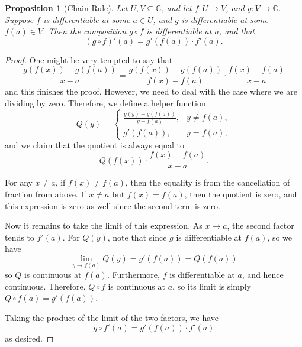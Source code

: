\documentclass[11pt]{article}
\numberwithin{equation}{section}
\newtheorem{proposition}[theorem]{Proposition}
\theoremstyle{definition}
\theoremstyle{remark}
\newcommand{\pqty}[1]{\left(#1\right)}
\newcommand{\functiondomain}[3]{#1:#2\to #3}
\newcommand{\CC}{\mathbb C}
\begin{document}
\begin{proposition}[Chain Rule]\label{analysis-unit-0107}
    \label{prop:chain-rule}%
    Let \(U, V \subseteq \CC\), and let \(\functiondomain{f}{U}{V}\), and \(\functiondomain{g}{V}{\CC}\). Suppose \(f\) is differentiable at some \(a \in U\), and \(g\) is differentiable at some \(f\pqty{a} \in V\). Then the composition \(g \circ f\) is differentiable at \(a\), and that
    \[
        \pqty{g \circ f}'\pqty{a} = g' \pqty{f\pqty{a}} \cdot f'\pqty{a}.
    \]
\end{proposition}

\begin{proof}
    One might be very tempted to say that
    \[
        \frac{g\pqty{f\pqty{x}} - g\pqty{f\pqty{a}}}{x - a} = \frac{g\pqty{f\pqty{x}} - g\pqty{f\pqty{a}}}{f\pqty{x} - f\pqty{a}} \cdot \frac{f\pqty{x} - f\pqty{a}}{x - a}
    \]
    and this finishes the proof. However, we need to deal with the case where we are dividing by zero. Therefore, we define a helper function
    \[
        Q\pqty{y} = \begin{cases}
            \frac{g\pqty{y} - g\pqty{f\pqty{a}}}{y - f\pqty{a}}, & y \neq f\pqty{a}, \\
            g'\pqty{f\pqty{a}}, & y = f\pqty{a},
        \end{cases}
    \]
    and we claim that the quotient is always equal to
    \[
        Q\pqty{f\pqty{x}} \cdot \frac{f\pqty{x} - f\pqty{a}}{x - a}.
    \]

    For any \(x \neq a\), if \(f\pqty{x} \neq f\pqty{a}\), then the equality is from the cancellation of fraction from above. If \(x \neq a\) but \(f\pqty{x} = f\pqty{a}\), then the quotient is zero, and this expression is zero as well since the second term is zero.

    Now it remains to take the limit of this expression. As \(x \to a\), the second factor tends to \(f'\pqty{a}\). For \(Q\pqty{y}\), note that since \(g\) is differentiable at \(f\pqty{a}\), so we have
    \[
        \lim_{y \to f\pqty{a}} Q\pqty{y} = g'\pqty{f\pqty{a}} = Q\pqty{f\pqty{a}}
    \]
    so \(Q\) is continuous at \(f\pqty{a}\). Furthermore, \(f\) is differentiable at \(a\), and hence continuous. Therefore, \(Q \circ f\) is continuous at \(a\), so its limit is simply \(Q\circ f\pqty{a} = g'\pqty{f\pqty{a}}\).

    Taking the product of the limit of the two factors, we have
    \[
        g \circ f'\pqty{a} = g'\pqty{f\pqty{a}} \cdot f'\pqty{a}
    \]
    as desired.
\end{proof}
\end{document}
